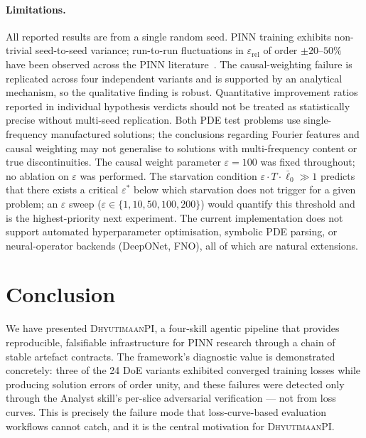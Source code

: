 \documentclass{article}
\newcommand{\dhyutimaan}{\textsc{DhyutimaanPI}}
\newcommand{\relL}{\varepsilon_{\mathrm{rel}}}
\begin{document}
\paragraph{Limitations.}
All reported results are from a single random seed.
PINN training exhibits non-trivial seed-to-seed variance; run-to-run
fluctuations in $\relL$ of order $\pm 20\text{--}50\%$ have been observed
across the PINN literature~\citep{pinnacle2024}.
The causal-weighting failure is replicated across four independent variants
and is supported by an analytical mechanism, so the qualitative finding is
robust.
Quantitative improvement ratios reported in individual hypothesis verdicts
should not be treated as statistically precise without multi-seed replication.
Both PDE test problems use single-frequency manufactured solutions; the
conclusions regarding Fourier features and causal weighting may not generalise
to solutions with multi-frequency content or true discontinuities.
The causal weight parameter $\varepsilon=100$ was fixed throughout; no ablation
on $\varepsilon$ was performed.
The starvation condition $\varepsilon\cdot T\cdot\bar{\ell}_0\gg1$ predicts that
there exists a critical $\varepsilon^*$ below which starvation does not trigger
for a given problem; an $\varepsilon$ sweep ($\varepsilon\in\{1,10,50,100,200\}$)
would quantify this threshold and is the highest-priority next experiment.
The current implementation does not support automated hyperparameter
optimisation, symbolic PDE parsing, or neural-operator backends (DeepONet,
FNO), all of which are natural extensions.

\section{Conclusion}
\label{sec:conclusion}

We have presented \dhyutimaan{}, a four-skill agentic pipeline that provides
reproducible, falsifiable infrastructure for PINN research through a
chain of stable artefact contracts.
The framework's diagnostic value is demonstrated concretely: three of the 24
DoE variants exhibited converged training losses while producing solution errors
of order unity, and these failures were detected only through the Analyst
skill's per-slice adversarial verification — not from loss curves.
This is precisely the failure mode that loss-curve-based evaluation
workflows cannot catch, and it is the central motivation for \dhyutimaan{}.
\end{document}
